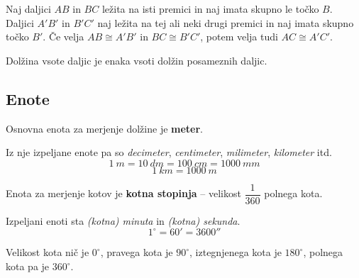     \begin{aksiom}
        Naj daljici $AB$ in $BC$ ležita na isti premici in naj imata skupno le točko $B$.
        Daljici $A'B'$ in $B'C'$ naj ležita na tej ali neki drugi premici in naj imata skupno točko $B'$.
        Če velja $AB\cong A'B'$ in $BC\cong B'C'$, potem velja tudi $AC\cong A'C'$.
    \end{aksiom}

    \begin{izrek}
        Dolžina vsote daljic je enaka vsoti dolžin posameznih daljic.
    \end{izrek}




    \subsection*{Enote}


    
        Osnovna enota za merjenje dolžine je \textbf{meter}.

        Iz nje izpeljane enote pa so \textit{decimeter}, \textit{centimeter}, \textit{milimeter}, \textit{kilometer} itd.
        $$ 1~m=10~dm=100~cm=1000~mm$$  $$1~km=1000~m$$ 
    

    
        Enota za merjenje kotov je \textbf{kotna stopinja} -- velikost $\dfrac{1}{360}$ polnega kota.
        
        Izpeljani enoti sta \textit{(kotna) minuta} in \textit{(kotna) sekunda}.
        $$1^\circ=60'=3600''$$ 
    

    
        Velikost kota nič je $0^\circ$, pravega kota je $90^\circ$, iztegnjenega kota je $180^\circ$, polnega kota pa je $360^\circ$.
    

~


